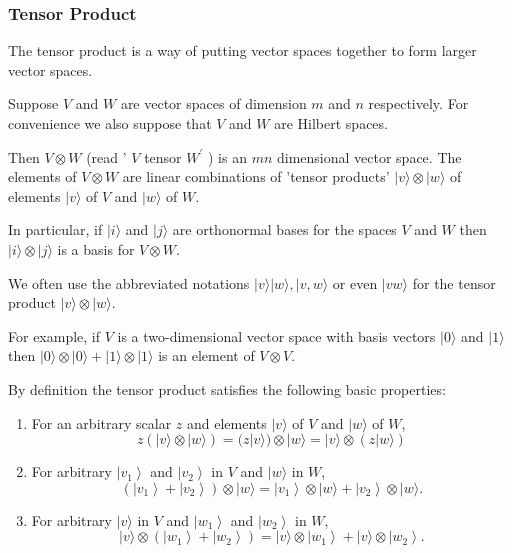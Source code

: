 
\subsubsection{Tensor Product}

The tensor product is a way of putting vector spaces together to form larger vector spaces. 


Suppose $V$ and $W$ are vector spaces of dimension $m$ and $n$ respectively. For convenience we also suppose that $V$ and $W$ are Hilbert spaces. 

Then $V \otimes W$ (read ' $V$ tensor $W^{\prime}$ ) is an $m n$ dimensional vector space. The elements of $V \otimes W$ are linear combinations of 'tensor products' $|v\rangle \otimes|w\rangle$ of elements $|v\rangle$ of $V$ and $|w\rangle$ of $W$.

In particular, if $|i\rangle$ and $|j\rangle$ are orthonormal bases for the spaces $V$ and $W$ then $|i\rangle \otimes|j\rangle$ is a basis for $V \otimes W$. 

We often use the abbreviated notations $|v\rangle|w\rangle,|v, w\rangle$ or even $|v w\rangle$ for the tensor product $|v\rangle \otimes|w\rangle$. 

\begin{example}
    For example, if $V$ is a two-dimensional vector space with basis vectors $|0\rangle$ and $|1\rangle$ then $|0\rangle \otimes|0\rangle+|1\rangle \otimes|1\rangle$ is an element of $V \otimes V$.
\end{example}

By definition the tensor product satisfies the following basic properties:
\begin{enumerate}
    \item For an arbitrary scalar $z$ and elements $|v\rangle$ of $V$ and $|w\rangle$ of $W$,
\begin{equation}
    z(|v\rangle \otimes|w\rangle)=(z|v\rangle) \otimes|w\rangle=|v\rangle \otimes(z|w\rangle)
\end{equation}
    \item For arbitrary $\left|v_{1}\right\rangle$ and $\left|v_{2}\right\rangle$ in $V$ and $|w\rangle$ in $W$,
\begin{equation}
    \left(\left|v_{1}\right\rangle+\left|v_{2}\right\rangle\right) \otimes|w\rangle=\left|v_{1}\right\rangle \otimes|w\rangle+\left|v_{2}\right\rangle \otimes|w\rangle .
\end{equation}
    \item For arbitrary $|v\rangle$ in $V$ and $\left|w_{1}\right\rangle$ and $\left|w_{2}\right\rangle$ in $W$,
\begin{equation}
    |v\rangle \otimes\left(\left|w_{1}\right\rangle+\left|w_{2}\right\rangle\right)=|v\rangle \otimes\left|w_{1}\right\rangle+|v\rangle \otimes\left|w_{2}\right\rangle .
\end{equation}
\end{enumerate}

